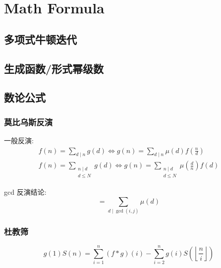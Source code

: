 \section{Math Formula}

\subsection{多项式牛顿迭代}


\subsection{生成函数/形式幂级数}

\subsection{数论公式}
\subsubsection{莫比乌斯反演}
一般反演:
\begin{equation*}
    \begin{aligned}
        f(n)=\sum_{d\mid n}g(d) \Longleftrightarrow g(n)=\sum_{d\mid n} \mu (d)f(\frac{n}{d})\\
        f(n)=\sum_{\substack{n\mid d\\ d\le N}}g(d) \Longleftrightarrow g(n)=\sum_{\substack{n\mid d\\ d\le N}} \mu (\frac{d}{n})f(d)
    \end{aligned}
\end{equation*}

gcd 反演结论:
\begin{equation*}
    [\operatorname{gcd}(i, j)=1]=\sum_{d \mid \operatorname{gcd}(i, j)} \mu(d)
\end{equation*}
\subsubsection{杜教筛}
\begin{equation*}
    g(1) S(n)=\sum_{i=1}^{n}(f * g)(i)-\sum_{i=2}^{n} g(i) S\left(\left\lfloor\frac{n}{i}\right\rfloor\right)
\end{equation*}
